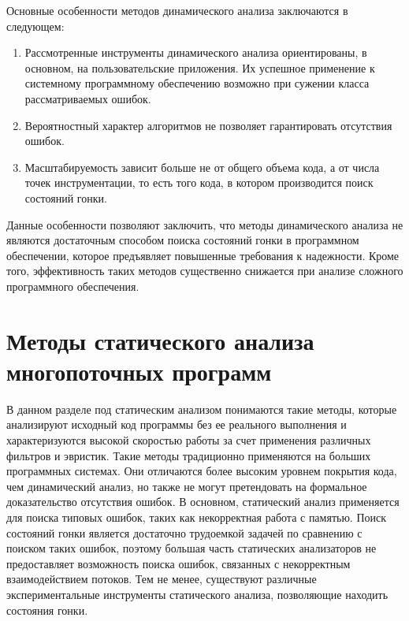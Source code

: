 Основные особенности методов динамического анализа заключаются в следующем:
\begin{enumerate}
\item Рассмотренные инструменты динамического анализа ориентированы, в основном, на пользовательские приложения. 
Их успешное применение к системному программному обеспечению возможно при сужении класса рассматриваемых ошибок.
\item Вероятностный характер алгоритмов не позволяет гарантировать отсутствия ошибок.
\item Масштабируемость зависит больше не от общего объема кода, а от числа точек инструментации, то есть того кода, в котором производится поиск состояний гонки. 
\end{enumerate}

Данные особенности позволяют заключить, что методы динамического анализа не являются достаточным способом поиска состояний гонки в программном обеспечении, которое предъявляет повышенные требования к надежности. 
Кроме того, эффективность таких методов существенно снижается при анализе сложного программного обеспечения.


\section{Методы статического анализа многопоточных программ}
\label{rw:static}

В данном разделе под статическим анализом понимаются такие методы, которые анализируют исходный код программы без ее реального выполнения и характеризуются высокой скоростью работы за счет применения различных фильтров и эвристик.
Такие методы традиционно применяются на больших программных системах.
Они отличаются более высоким уровнем покрытия кода, чем динамический анализ, но также не могут претендовать на формальное доказательство отсутствия ошибок.
В основном, статический анализ применяется для поиска типовых ошибок, таких как некорректная работа с памятью.
Поиск состояний гонки является достаточно трудоемкой задачей по сравнению с поиском таких ошибок, поэтому большая часть статических анализаторов не предоставляет возможность поиска ошибок, связанных с некорректным взаимодействием потоков.
Тем не менее, существуют различные экспериментальные инструменты статического анализа, позволяющие находить состояния гонки.

